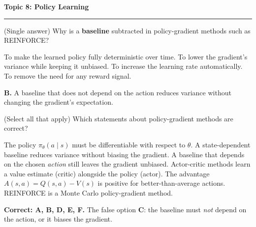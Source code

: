 \documentclass[answers,addpoints]{exam}
\newcommand{\topic}[2]{%
  \vspace{1.0\baselineskip}%
  \noindent\textbf{\large Topic #1: #2}\par
  \noindent\rule{\linewidth}{0.4pt}\par
  \vspace{0.4\baselineskip}}
\begin{document}
\begin{questions}

\topic{8}{Policy Learning}

\question[2] (Single answer) Why is a \textbf{baseline} subtracted in policy-gradient
methods such as REINFORCE?
\begin{choices}
  \choice To make the learned policy fully deterministic over time.
  \CorrectChoice To lower the gradient's variance while keeping it unbiased.
  \choice To increase the learning rate automatically.
  \choice To remove the need for any reward signal.
\end{choices}
\begin{solution}\textbf{B.} A baseline that does not depend on the action reduces
variance without changing the gradient's expectation.\end{solution}

\question[3] (Select all that apply) Which statements about policy-gradient methods
are correct?
\begin{checkboxes}
  \CorrectChoice The policy $\pi_\theta(a\mid s)$ must be differentiable with
        respect to $\theta$.
  \CorrectChoice A state-dependent baseline reduces variance without biasing the
        gradient.
  \choice A baseline that depends on the chosen \emph{action} still leaves the
        gradient unbiased.
  \CorrectChoice Actor-critic methods learn a value estimate (critic) alongside the
        policy (actor).
  \CorrectChoice The advantage $A(s,a)=Q(s,a)-V(s)$ is positive for
        better-than-average actions.
  \CorrectChoice REINFORCE is a Monte Carlo policy-gradient method.
\end{checkboxes}
\begin{solution}
\textbf{Correct: A, B, D, E, F.} The false option \textbf{C}: the baseline must
\emph{not} depend on the action, or it biases the gradient.
\end{solution}


\end{questions}
\end{document}
